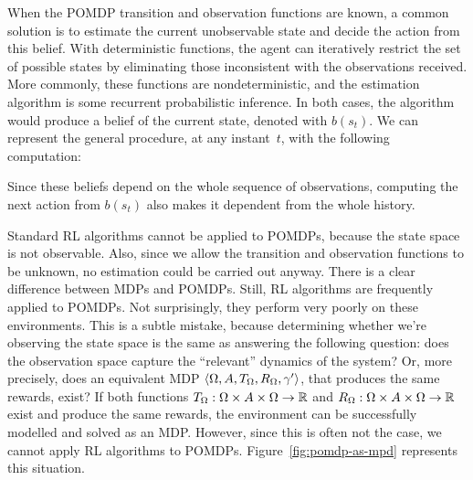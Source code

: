 When the POMDP transition and observation functions are known, a common
solution is to estimate the current unobservable state and decide the action
from this belief. With deterministic functions, the agent can iteratively
restrict the set of possible states by eliminating those inconsistent with the
observations received. More commonly, these functions are nondeterministic,
and the estimation algorithm is some recurrent probabilistic inference.
In both cases, the algorithm would produce a belief of the current state,
denoted with $b(s_t)$. We can represent the general procedure, at any
instant~$t$, with the following computation:
\begin{center}
\end{center}
Since these beliefs depend on the whole sequence of observations, computing
the next action from $b(s_t)$ also makes it dependent from the whole history.

Standard RL algorithms cannot be applied to POMDPs, because the state space is
not observable. Also, since we allow the transition and observation functions
to be unknown, no estimation could be carried out anyway.  There is a clear
difference between MDPs and POMDPs. Still, RL algorithms are frequently
applied to POMDPs. Not surprisingly, they perform very poorly on these
environments. This is a subtle mistake, because determining whether we're
observing the state space is the same as answering the following question:
does the observation space capture the ``relevant'' dynamics of the system?
Or, more precisely, does an equivalent MDP $\langle \Omega, A, T_\Omega,
R_\Omega, \gamma' \rangle$, that produces the same rewards, exist?  If both
functions $T_\Omega: \Omega \times A \times \Omega \to \mathbb{R}$ and $R_\Omega: \Omega
\times A \times \Omega \to \mathbb{R}$ exist and produce the same rewards, the
environment can be successfully modelled and solved as an MDP.
However, since this is often not the case, we cannot apply RL algorithms to
POMDPs. Figure~\ref{fig:pomdp-as-mpd} represents this situation.

